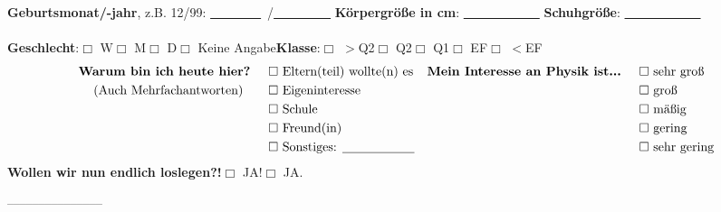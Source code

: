 \textbf{Geburtsmonat/-jahr}, \textsf{z.B. 12/99}: \underline{~~~~~~~~}~/\underline{~~~~~~~~~}\hspace{1cm} \textbf{Körpergröße in cm}: \underline{~~~~~~~~~~~~}\hspace{1cm} \textbf{Schuhgröße}: \underline{~~~~~~~~~~~~} \\ 
\vspace{0.2cm}\\
\textbf{Geschlecht}:\hspace{0.4cm}$\Box$ W\hspace{0.5cm}$\Box$ M\hspace{0.5cm}$\Box$ D\hspace{0.5cm}$\Box$ Keine Angabe\hspace{1cm}\textbf{Klasse}:\hspace{0.5cm}$\Box$ $>$Q2\hspace{0.5cm}$\Box$ Q2\hspace{0.5cm}$\Box$ Q1\hspace{0.5cm}$\Box$ EF\hspace{0.5cm}$\Box$ $<$EF \\
\begin{align*}
 \textmd{\textbf{Warum bin ich heute hier?}} \hspace{0.5cm}& \Box \textmd{ Eltern(teil) wollte(n) es} & \textmd{\textbf{Mein Interesse an Physik ist...}}  \hspace{0.5cm}& \Box \textmd{ sehr groß}\\
\textmd{(Auch Mehrfachantworten)}   \hspace{0.7cm}&\Box \textmd{ Eigeninteresse} && \Box \textmd{ groß}\\
    &\Box \textmd{ Schule} && \Box \textmd{ mäßig}\\
    &\Box \textmd{ Freund(in)} && \Box \textmd{ gering}\\
    &\Box \textmd{ Sonstiges: \underline{\hspace{2cm}}} && \Box \textmd{ sehr gering}
\end{align*}
\textbf{Wollen wir nun endlich loslegen?!}\hspace{0.5cm}$\Box$ JA!\hspace{0.5cm}$\Box$ JA. \newline

  --\hspace{1cm}--\hspace{1cm}--\hspace{1cm}--\hspace{1cm}--\hspace{1cm}--\hspace{1cm}--\hspace{1cm}--\hspace{1cm}--\hspace{1cm}--\hspace{1cm}--\hspace{1cm}--\hspace{1cm}--\hspace{1cm}--\hspace{1cm}--\hspace{1cm}

